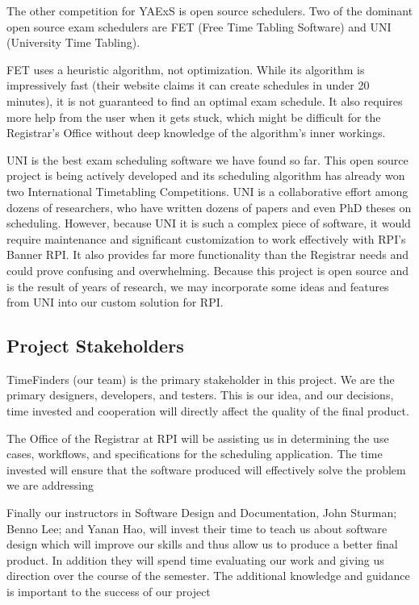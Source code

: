 \documentclass[11pt]{article}
\begin{document}
The other competition for YAExS is open source schedulers.  Two of the dominant open source exam schedulers are FET (Free Time Tabling Software) and UNI (University Time Tabling).

FET uses a heuristic algorithm, not optimization. While its algorithm is impressively fast (their website claims it can create schedules in under 20 minutes), it is not guaranteed to find an optimal exam schedule.
 It also requires more help from the user when it gets stuck, which might be difficult for the Registrar's Office without deep knowledge of the algorithm's inner workings. 

UNI is the best exam scheduling software we have found so far. This open source project is being actively developed and its scheduling algorithm has already won two International Timetabling Competitions.  
UNI is a collaborative effort among dozens of researchers, who have written dozens of papers and even PhD theses on scheduling.
However, because UNI it is such a complex piece of software,  it would require maintenance and significant customization to work effectively with RPI's Banner RPI.  
It also provides far more functionality than the Registrar needs  and could prove confusing and overwhelming.
Because this project is open source and is the result of years of research, we may incorporate some ideas and features from UNI into our custom solution for RPI.


\subsection{Project Stakeholders} %

TimeFinders (our team) is the primary stakeholder in this project.  We are the primary designers, developers, and testers.  This is our idea, and our decisions, time invested and cooperation will directly affect the quality of the final product.

The Office of the Registrar at RPI will be assisting us in determining the use cases, workflows, and specifications for the scheduling application.  The time invested will ensure that the software produced will effectively solve the problem we are addressing

Finally our instructors in Software Design and Documentation, John Sturman; Benno Lee; and Yanan Hao, will invest their time to teach us about software design which will improve our skills and thus allow us to produce a better final product.  In addition they will spend time evaluating our work and giving us direction over the course of the semester.  The additional knowledge and guidance is important to the success of our project
\end{document}
